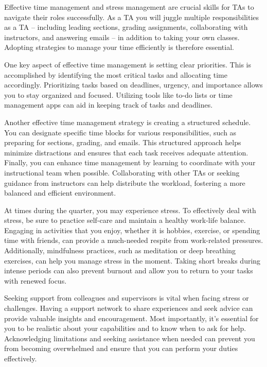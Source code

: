 \documentclass[
  letterpaper,
  DIV=11,
  numbers=noendperiod]{scrreprt}
\begin{document}
Effective time management and stress management are crucial skills for
TAs to navigate their roles successfully. As a TA you will juggle
multiple responsibilities as a TA -- including leading sections, grading
assignments, collaborating with instructors, and answering emails -- in
addition to taking your own classes. Adopting strategies to manage your
time efficiently is therefore essential.

One key aspect of effective time management is setting clear priorities.
This is accomplished by identifying the most critical tasks and
allocating time accordingly. Prioritizing tasks based on deadlines,
urgency, and importance allows you to stay organized and focused.
Utilizing tools like to-do lists or time management apps can aid in
keeping track of tasks and deadlines.

Another effective time management strategy is creating a structured
schedule. You can designate specific time blocks for various
responsibilities, such as preparing for sections, grading, and emails.
This structured approach helps minimize distractions and ensures that
each task receives adequate attention. Finally, you can enhance time
management by learning to coordinate with your instructional team when
possible. Collaborating with other TAs or seeking guidance from
instructors can help distribute the workload, fostering a more balanced
and efficient environment.

At times during the quarter, you may experience stress. To effectively
deal with stress, be sure to practice self-care and maintain a healthy
work-life balance. Engaging in activities that you enjoy, whether it is
hobbies, exercise, or spending time with friends, can provide a
much-needed respite from work-related pressures. Additionally,
mindfulness practices, such as meditation or deep breathing exercises,
can help you manage stress in the moment. Taking short breaks during
intense periods can also prevent burnout and allow you to return to your
tasks with renewed focus.

Seeking support from colleagues and supervisors is vital when facing
stress or challenges. Having a support network to share experiences and
seek advice can provide valuable insights and encouragement. Most
importantly, it's essential for you to be realistic about your
capabilities and to know when to ask for help. Acknowledging limitations
and seeking assistance when needed can prevent you from becoming
overwhelmed and ensure that you can perform your duties effectively.
\end{document}
